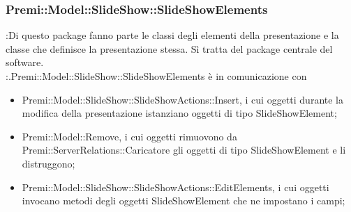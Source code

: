                      \subsubsection{Premi::Model::SlideShow::SlideShowElements}{
		\textbf{\tipo}:Di questo package fanno parte le classi degli elementi della presentazione e la classe che definisce la presentazione stessa. Sì tratta del package centrale del software.\\
		\textbf{\relaz}:.Premi::Model::SlideShow::SlideShowElements è in comunicazione con 
        \begin{itemize}
        \item Premi::Model::SlideShow::SlideShowActions::Insert, i cui oggetti durante la modifica della presentazione istanziano oggetti di tipo SlideShowElement;
        \item Premi::Model::Remove, i cui oggetti rimuovono da Premi::ServerRelations::Caricatore gli oggetti di tipo SlideShowElement e li distruggono;
        \item Premi::Model::SlideShow::SlideShowActions::EditElements, i cui oggetti invocano metodi degli oggetti SlideShowElement che ne impostano i campi;
  		\end{itemize}

}
